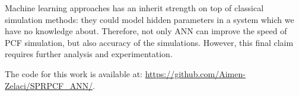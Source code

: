 \documentclass[draft, 10pt]{IEEEtran}
\begin{document}
Machine learning approaches has an inherit strength on top of classical simulation methods: they could model hidden parameters in a system which we have no knowledge about. Therefore, not only ANN can improve the speed of PCF simulation, but also accuracy of the simulations. However, this final claim requires further analysis and experimentation.

The code for this work is available at: \url{https://github.com/Aimen-Zelaci/SPRPCF_ANN/}.


	
\end{document}
